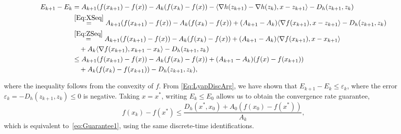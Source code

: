 \documentclass[11pt]{article}
\theoremstyle{plain}
\begin{document}
\begin{small}
\begin{subequations}\label{Eq:LyapDiscArg}
\begin{align}
E_{k+1} - E_k &= A_{k+1}(f(x_{k+1}) - f(x)) - A_k(f(x_k) - f(x)) -\langle \nabla h(z_{k+1}) - \nabla h(z_k), x - z_{k+1}\rangle - D_h(z_{k+1}, z_k)\notag\\
& \overset{\eqref{Eq:XSeq}}{=} A_{k+1}(f(x_{k+1}) - f(x)) - A_k(f(x_k) - f(x)) + (A_{k+1} - A_k) \langle \nabla f(x_{k+1}), x - z_{k+1}\rangle - D_h(z_{k+1}, z_k)\notag\\
& \overset{\eqref{Eq:ZSeq}}{=} A_{k+1}(f(x_{k+1}) - f(x)) - A_k(f(x_k) - f(x)) + (A_{k+1} - A_k) \langle \nabla f(x_{k+1}), x - x_{k+1}\rangle \notag\\
&\quad + A_k \langle \nabla f(x_{k+1}), x_{k+1} - x_k\rangle- D_h(z_{k+1}, z_k)\notag\\
%
&\leq A_{k+1}(f(x_{k+1}) - f(x)) - A_k(f(x_k) - f(x)) + (A_{k+1} - A_k)(f(x) - f(x_{k+1})) \notag\\
&\quad  + A_k (f(x_k) - f(x_{k+1}))- D_h(z_{k+1}, z_k), 
\end{align}
\end{subequations}
\end{small}
where the inequality follows from the convexity of $f$. From \eqref{Eq:LyapDiscArg}, we have shown that $E_{k+1} - E_k \leq \varepsilon_k $, where the error $\varepsilon_k = -D_h(z_{k+1}, z_k) \leq 0 $ is negative. Taking $x = x^\ast$, writing $E_k \leq E_0$ allows us to obtain the convergence rate guarantee, 
\begin{equation}
f(x_k) - f(x^\ast) \leq \frac{D_h(x^\ast, x_0) + A_0 (f(x_0) - f(x^\ast))}{A_k},
\end{equation} 
which is equivalent to~\eqref{eq:Guarantee1}, using the same discrete-time identifications. 
\end{document}

